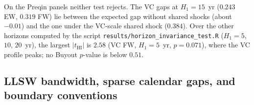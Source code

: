 On the Preqin panels neither test rejects. The VC gaps at $H_1 = 15$~yr ($0.243$ EW, $0.319$ FW) lie between the expected gap without shared shocks (about $-0.01$) and the one under the VC-scale shared shock ($0.384$). Over the other horizons computed by the script \texttt{results/\allowbreak horizon\_invariance\_test.R} ($H_1 = 5$, $10$, $20$~yr), the largest $|t_{\mathrm{HI}}|$ is $2.58$ (VC FW, $H_1 = 5$~yr, $p = 0.071$), where the VC profile peaks; no Buyout $p$-value is below $0.51$.



\subsection{LLSW bandwidth, sparse calendar gaps, and boundary conventions}
\label{sec:llsw_bandwidth_app}


